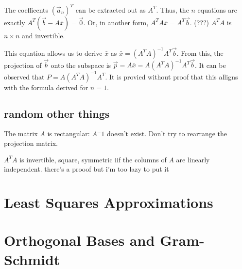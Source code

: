 \documentclass{article}
\begin{document}
The coefficents $(\vec{a}_n)^T$ can be extracted out as $A^T$.
Thus, the $n$ equations are exactly $A^T (\vec{b} - A \bar{x}) = \vec{0}$.
Or, in another form, $A^T A \bar{x} = A ^ T \vec{b}$.
(???) $A^T A$ is $n \times n$ and invertible.

This equation allows us to derive $\bar{x}$ as $\bar{x} = (A^T A) ^ {-1} A^T \vec{b}$.
From this, the projection of $\vec{b}$ onto the subspace is $\vec{p} = A \bar{x} = A (A^T A) ^ {-1} A^T \vec{b}$.
It can be observed that $P = A (A^T A) ^ {-1} A^T$.
It is provied without proof that this alligns with the formula derived for $n = 1$.

\subsection{random other things}
The matrix $A$ is rectangular: $A^-1$ doesn't exist.
Don't try to rearrange the projection matrix.

$A^T A$ is invertible, square, symmetric iif the columns of $A$ are linearly independent. there's a prooof but i'm too lazy to put it

\section{Least Squares Approximations}

\section{Orthogonal Bases and Gram-Schmidt}
\cite{ctan}

\newpage

\nocite{*}


\end{document}
